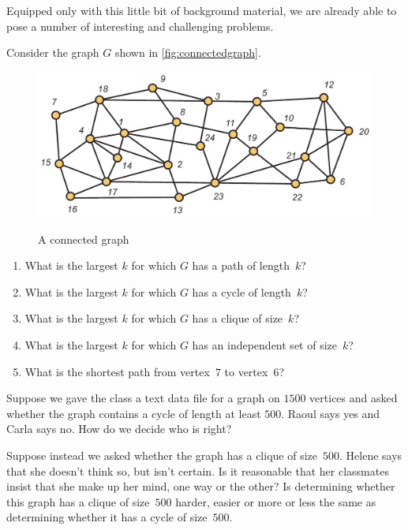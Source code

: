 Equipped only with this little bit of background
material, we are already able to pose a number
of interesting and challenging problems.  

\begin{example}
Consider the graph $G$ shown in \autoref{fig:connectedgraph}.

\begin{figure}
\begin{center}
\includegraphics[scale=.6]{intro-figs/3012-fig17}\\
\caption{A connected graph}
\label{fig:connectedgraph}
\end{center}
\end{figure}

\begin{enumerate}
\item What is the largest $k$ for which $G$ has a path
of length~$k$? 
\item What is the largest $k$ for which $G$ has a cycle 
of length~$k$? 
\item What is the largest $k$ for which $G$ has a clique
of size~$k$? 
\item What is the largest $k$ for which $G$ has an
independent set of size~$k$? 
\item  What is the shortest path from vertex~$7$ to
vertex~$6$?
\end{enumerate}

Suppose we gave the class a text data file for a graph
on $1500$ vertices and asked whether the graph contains
a cycle of length at least $500$.  Raoul says yes and
Carla says no. How do we decide who is right?

Suppose instead we asked whether the graph has a clique of
size~$500$.  Helene says that she doesn't think so, but isn't
certain.  Is it reasonable that her classmates insist that
she make up her mind, one way or the other?  Is determining whether
this graph has a clique of size~$500$ harder, easier or
more or less the same as determining whether
it has a cycle of size~$500$.
\end{example}

